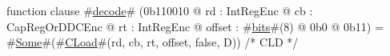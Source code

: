 function clause #\hyperref[zdecode]{decode}# (0b110010 @ rd : IntRegEnc @ cb : CapRegOrDDCEnc @ rt : IntRegEnc @ offset : #\hyperref[zbits]{bits}#(8) @ 0b0 @ 0b11) = #\hyperref[zSome]{Some}#(#\hyperref[zCLoad]{CLoad}#(rd, cb, rt, offset, false, D)) /* CLD */
